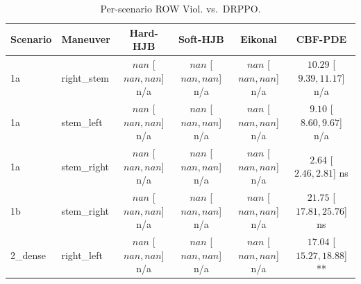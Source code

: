 \begin{table}[ht]
\centering
\caption{Per-scenario ROW Viol. vs.\ DRPPO.}
\label{tab:per_scenario_row_violations_per_ep_mean}
\begin{tabular}{llcccc}
\toprule
Scenario & Maneuver & Hard-HJB & Soft-HJB & Eikonal & CBF-PDE \\
\midrule
1a & right_stem & $nan$ [$nan, nan$] n/a & $nan$ [$nan, nan$] n/a & $nan$ [$nan, nan$] n/a & $10.29$ [$9.39, 11.17$] n/a \\
1a & stem_left & $nan$ [$nan, nan$] n/a & $nan$ [$nan, nan$] n/a & $nan$ [$nan, nan$] n/a & $9.10$ [$8.60, 9.67$] n/a \\
1a & stem_right & $nan$ [$nan, nan$] n/a & $nan$ [$nan, nan$] n/a & $nan$ [$nan, nan$] n/a & $2.64$ [$2.46, 2.81$] ns \\
1b & stem_right & $nan$ [$nan, nan$] n/a & $nan$ [$nan, nan$] n/a & $nan$ [$nan, nan$] n/a & $21.75$ [$17.81, 25.76$] ns \\
2_dense & right_left & $nan$ [$nan, nan$] n/a & $nan$ [$nan, nan$] n/a & $nan$ [$nan, nan$] n/a & $17.04$ [$15.27, 18.88$] ** \\
\bottomrule
\end{tabular}
\end{table}
